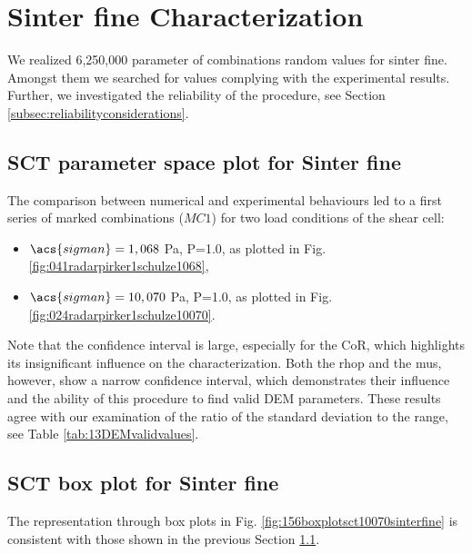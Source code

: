 \section{Sinter fine Characterization}
\label{sec:sinterfinecharacterization}

We realized 6,250,000 parameter of combinations random values for sinter fine.
Amongst them we searched for values complying with the experimental results.
Further, we investigated the reliability of the procedure, see Section
\ref{subsec:reliabilityconsiderations}.

\subsection{SCT parameter space plot for Sinter fine}
\label{subsec:sctparameterspacesinterfine}



The comparison between numerical and experimental behaviours led to a first
series of marked combinations ($MC1$) for two load conditions of
the shear cell:
\begin{itemize}
  \item{$\acs{sigman} = 1,068$ Pa, P=1.0, as plotted in Fig.
  \ref{fig:041radarpirker1schulze1068},}
  \item{$\acs{sigman} = 10,070$ Pa, P=1.0, as plotted in Fig.
  \ref{fig:024radarpirker1schulze10070}.}
\end{itemize}
Note that the confidence interval is large, 
especially for the \acs{CoR}, which highlights its insignificant influence on the
characterization.
Both the \acs{rhop}  and the \acs{mus}, however, show a narrow confidence interval, 
which demonstrates their influence and the ability of this procedure to find
valid \acs{DEM} parameters.
These results agree with our examination of the ratio of the standard deviation
to the range, see Table \ref{tab:13DEMvalidvalues}.

\subsection{SCT box plot for Sinter fine}
\label{subsec:sctboxsinterfine}

The representation through box plots in Fig.
\ref{fig:156boxplotsct10070sinterfine} is consistent with those shown in the
previous Section \ref{subsec:sctparameterspacesinterfine}.



